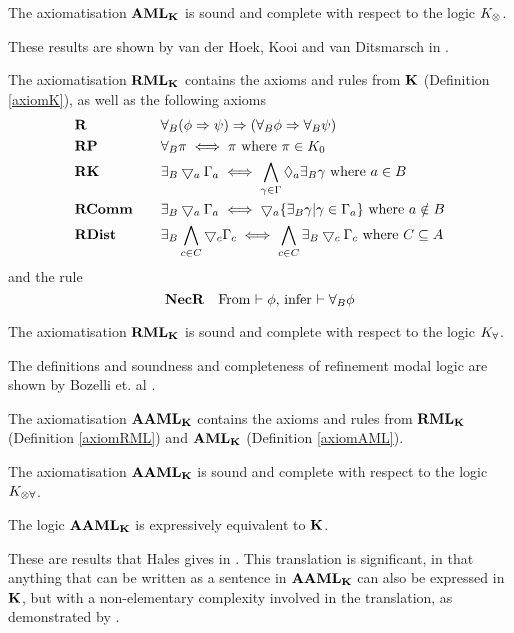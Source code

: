 \begin{lemma} \label{axiomAMLSoundComplete}
The axiomatisation $\bf AML_{\bf K}$ is sound and complete with respect to the logic $K_{\otimes}$.
\end{lemma}

These results are shown by van der Hoek, Kooi and van Ditsmarsch in \cite{hoek2008dynamic}.

\begin{defn} \label{axiomRML}
The axiomatisation $\bf RML_{\bf K}$ contains the axioms and rules from $\bf K$ (Definition \ref{axiomK}), as well as the following axioms
\begin{alignat*}{2}
	& \bf R && \quad \forall_B (\phi \Rightarrow \psi) \Rightarrow (\forall_B \phi \Rightarrow \forall_B \psi) \\
	& \bf RP && \quad \forall_B \pi \iff \pi \text{ where } \pi \in K_0 \\
	& \bf RK && \quad\exists_B \bigtriangledown_a \Gamma_a \iff \bigwedge_{\gamma \in \Gamma} \Diamond_a \exists_B
	\gamma \text{ where } a \in B \\
	& \bf RComm && \quad \exists_B \bigtriangledown_a \Gamma_a \iff \bigtriangledown_a \{ \exists_B \gamma | \gamma \in
	\Gamma_a\} \text{ where } a \notin B\\
	& \bf RDist && \quad \exists_B \bigwedge_{c \in C} \bigtriangledown_c \Gamma_c \iff \bigwedge_{c \in C}
	\exists_B \bigtriangledown_c \Gamma_c \text{ where } C \subseteq A
\end{alignat*}
and the rule
\[
	\bf NecR \quad \text{From $\vdash \phi$, infer $\vdash \forall_B \phi$}
\]
\end{defn}

\begin{lemma} \label{axiomRMLSoundComplete}
The axiomatisation $\bf RML_{\bf K}$ is sound and complete with respect to the logic $K_{\forall}$.
\end{lemma}

The definitions and soundness and completeness of refinement modal logic are shown by Bozelli et. al
\cite{DBLPjournalscorrabs12023538}.

\begin{defn} \label{axiomAAML}
The axiomatisation $\bf AAML_{\bf K}$ contains the axioms and rules from $\bf RML_{\bf K}$ (Definition \ref{axiomRML})
and $\bf AML_{\bf K}$ (Definition \ref{axiomAML}).
\end{defn}

\begin{thm} \label{axiomAAMLSoundComplete}
The axiomatisation $\bf AAML_{\bf K}$ is sound and complete with respect to the logic $K_{\otimes\forall}$.
\end{thm}

\begin{thm} \label{thm:AAMLExpressivelyEquivalent}
The logic $\bf AAML_{\bf K}$ is expressively equivalent to $\bf K$.
\end{thm}

These are results that Hales gives in \cite{hales13synthesis}.
This translation is significant, in that anything that can be written as a sentence in $\bf AAML_{\bf K}$ can
also be expressed in $\bf K$, but with a non-elementary complexity involved in the translation, as
demonstrated by \cite{van2010future}.
